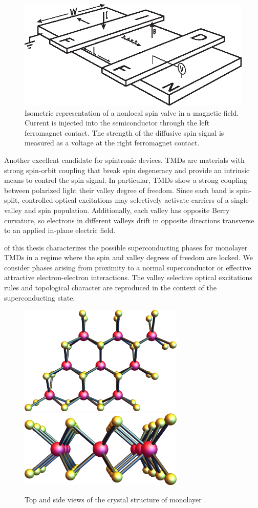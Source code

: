 \begin{figure}[b]
  \centering
  \includegraphics[width=\textwidth]{figures/device}
  \caption{%
    Isometric representation of a nonlocal spin valve in a magnetic field.
    Current is injected into the semiconductor
    through the left ferromagnet contact.
    The strength of the diffusive spin signal is measured as a voltage
    at the right ferromagnet contact.
  }\label{fig:spin-device}
\end{figure}

Another excellent candidate for spintronic devices,
TMDs are materials with strong spin-orbit coupling that break spin degeneracy
and provide an intrinsic means to control the spin signal.
In particular, TMDs show a strong coupling
between polarized light their valley degree of freedom.
Since each band is spin-split, controlled optical excitations
may selectively activate carriers of a single valley and spin population.
Additionally, each valley has opposite Berry curvature, so
electrons in different valleys drift in opposite directions transverse
to an applied in-plane electric field.

 of this thesis
characterizes the possible superconducting phases for monolayer TMDs
in a regime where the spin and valley degrees of freedom are locked.
We consider phases arising from proximity to a normal superconductor
or effective attractive electron-electron interactions.
The valley selective optical excitations rules
and topological character are reproduced
in the context of the superconducting state.

\begin{figure}
  \centering
  \includegraphics[width=0.7\textwidth]{figures/tmd-crystal-top.png}
  \includegraphics[width=0.7\textwidth]{figures/tmd-crystal-side.png}
  \caption{%
    Top and side views of the crystal structure of monolayer .
  }\label{fig:tmd-crystal}
\end{figure}
